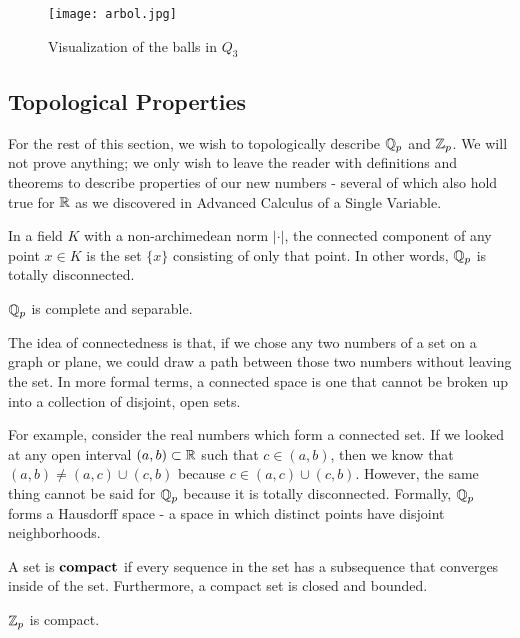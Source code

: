 \documentclass[a4paper]{article}
\begin{document}
\begin{figure}[!h]
  \centering
  \texttt{[image: arbol.jpg]}
  \caption{\label{fig:arbol}Visualization of the balls in
  $Q_3$}
\end{figure}

\subsection{Topological Properties}

For the rest of this section, we wish to topologically describe $\mathbb Q_p$
and $\mathbb Z_p$.  We will not prove anything; we only wish to leave the 
reader with definitions and theorems to describe properties of our new 
numbers - several of which also hold true for $\mathbb R$ as we discovered in 
Advanced Calculus of a Single Variable.

\begin{theorem}
In a field $K$ with a non-archimedean norm $|\cdot|$, the
connected component of any point $x\in K$ is the set $\{x\}$
consisting of only that point.  In other words, $\mathbb Q_p$ is totally 
disconnected.
\end{theorem}

\begin{corollary}
$\mathbb Q_p$ is complete and separable.
\end{corollary}

The idea of connectedness is that, if we chose any two numbers of a set 
on a graph or plane, we could draw a path between those two numbers 
without leaving the set.  In more formal terms, a connected space is one
that cannot be broken up into a collection of disjoint, open sets.

For example, consider the real numbers which form a connected set.  If we 
looked at any open interval $(a,b)\subset\mathbb R$ such that $c\in(a,b)$, 
then we know that $(a,b)\neq(a,c)\cup(c,b)$ because $c\in(a,c)\cup(c,b)$.
However, the same thing cannot be said for $\mathbb Q_p$ because it is 
totally disconnected.  Formally, $\mathbb Q_p$ forms a Hausdorff space - a 
space in which distinct points have disjoint neighborhoods.

\begin{definition}
A set is $\bf{compact}$ if every sequence in the set has a subsequence
that converges inside of the set.  Furthermore, a compact set is closed and bounded.
\end{definition}

\begin{theorem}
$\mathbb Z_p$ is compact.
\end{theorem}
\end{document}
